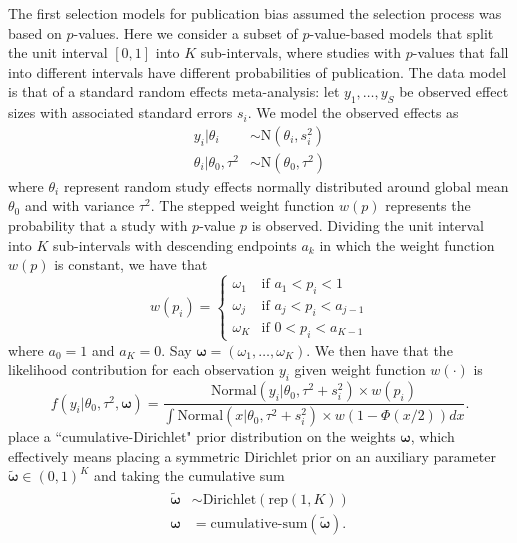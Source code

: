 \documentclass[12pt]{article}   	%
\numberwithin{equation}{section}
\begin{document}
The first selection models for publication bias assumed the selection process was based on $p$-values. Here we consider a subset of $p$-value-based models that split the unit interval $[0, 1]$ into $K$ sub-intervals, where studies with $p$-values that fall into different intervals have different probabilities of publication. The data model is that of a standard random effects meta-analysis: let $y_1, \dots, y_S$ be observed effect sizes with associated standard errors $s_i$.  We model the observed effects as
\begin{align}
y_i \vert \theta_i & \sim \mbox{N}(\theta_i, s_i ^ 2) \\
\theta_i \vert \theta_0, \tau ^ 2 & \sim \mbox{N}(\theta_0, \tau ^ 2)
\end{align}
where $\theta_i$ represent random study effects normally distributed around global mean $\theta_0$ and with variance $\tau^2$. The stepped weight function $w(p)$ represents the probability that a study with $p$-value $p$ is observed. Dividing the unit interval into $K$ sub-intervals with descending endpoints $a_k$ in which the weight function $w(p)$ is constant, we have that
\begin{equation}
w(p_i) =
	\begin{cases}
		\omega_1 & \text{if $a_1 < p_i < 1$} \\
		\omega_j & \text{if $a_{j} < p_i < a_{j-1}$} \\
		\omega_K & \text{if $0 < p_i < a_{K-1}$}
	\end{cases} \label{eq:weight_fcn}
\end{equation}
where $a_0 = 1$ and $a_K = 0$. Say $\boldsymbol{\omega} = (\omega_1, \dots, \omega_K)$. We then have that the likelihood contribution for each observation $y_i$ given weight function $w(\cdot)$ is 
\begin{equation}
f(y_i \vert \theta_0, \tau^2, \boldsymbol{\omega}) = \frac{\text{Normal}(y_i \vert \theta_0, \tau^2 + s_i^2) \times w(p_i)}{\int \text{Normal}(x \vert \theta_0, \tau^2 + s_i^2) \times w(1 - \Phi(x/2)) dx}. \label{eq:weightednormal}
\end{equation}
\citet{maier2020robma} place a ``cumulative-Dirichlet" prior distribution on the weights $\boldsymbol{\omega}$, which effectively means placing a symmetric Dirichlet prior on an auxiliary parameter $\widetilde{\boldsymbol{\omega}} \in (0, 1)^K$ and taking the cumulative sum 
\begin{align}
\begin{split}
\widetilde{\boldsymbol{\omega}} & \sim \text{Dirichlet}(\text{rep}(1, K))  \\
\boldsymbol{\omega} &= \text{cumulative-sum}(\widetilde{\boldsymbol{\omega}}). 
\end{split}
\end{align}
\end{document}
